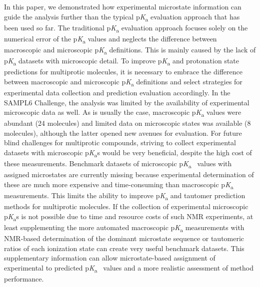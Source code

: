 \documentclass[9pt,lineno,final]{elife}
\newcommand{\pKa}{p\textit{K}\textsubscript{a}}
\begin{document}
In this paper, we demonstrated how experimental microstate information can guide the analysis further than the typical \pKa{} evaluation approach that has been used so far. 
The traditional \pKa{} evaluation approach focuses solely on the numerical error of the \pKa{} values and neglects the difference between macroscopic and microscopic \pKa{} definitions.
This is mainly caused by the lack of \pKa{} datasets with microscopic detail. 
To improve \pKa{} and protonation state predictions for multiprotic molecules, it is necessary to embrace the difference between macroscopic and microscopic \pKa{} definitions and select strategies for experimental data collection and prediction evaluation accordingly.
In the SAMPL6 Challenge, the analysis was limited by the availability of experimental microscopic data as well. 
As is usually the case, macroscopic \pKa{} values were abundant (24 molecules) and limited data on microscopic states was available (8 molecules), although the latter opened new avenues for evaluation. 
For future blind challenges for multiprotic compounds, striving to collect experimental datasets with microscopic \pKa{}s would be very beneficial, despite the high cost of these measurements. 
Benchmark datasets of microscopic \pKa{}~ values with assigned microstates are currently missing because experimental determination of these are much more expensive and time-consuming than macroscopic \pKa{} measurements. 
This limits the ability to improve \pKa{} and tautomer prediction methods for multiprotic molecules. 
If the collection of experimental microscopic \pKa{}s is not possible due to time and resource costs of such NMR experiments, at least supplementing the more automated macroscopic \pKa{} measurements with NMR-based determination of the dominant microstate sequence or tautomeric ratios of each ionization state can create very useful benchmark datasets. 
This supplementary information can allow microstate-based assignment of experimental to predicted \pKa{}~ values and a more realistic assessment of method performance.
\end{document}
